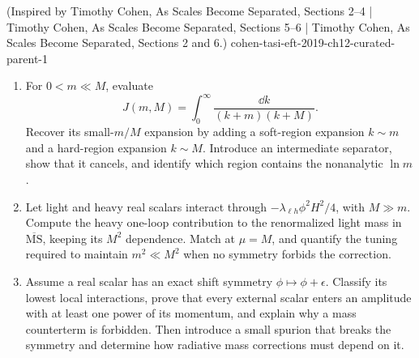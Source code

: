 \begin{enumerate}
  {(Inspired by Timothy Cohen, As Scales Become Separated, Sections 2--4 | Timothy Cohen, As Scales Become Separated, Sections 5--6 | Timothy Cohen, As Scales Become Separated, Sections 2 and 6.)}
  {cohen-tasi-eft-2019-ch12-curated-parent-1}
\begin{enumerate}
\item
For \(0<m\ll M\), evaluate
\[
 J(m,M)=\int_0^\infty\frac{\dd k}{(k+m)(k+M)}.
\]
Recover its small-\(m/M\) expansion by adding a soft-region expansion
\(k\sim m\) and a hard-region expansion \(k\sim M\).  Introduce an
intermediate separator, show that it cancels, and identify which region
contains the nonanalytic \(\ln m\).
\item
Let light and heavy real scalars interact through
\(-\lambda_{\ell h}\phi^2H^2/4\), with \(M\gg m\).  Compute the heavy
one-loop contribution to the renormalized light mass in
\(\overline{\mathrm{MS}}\), keeping its \(M^2\) dependence.  Match at
\(\mu=M\), and quantify the tuning required to maintain \(m^2\ll M^2\)
when no symmetry forbids the correction.
\item
Assume a real scalar has an exact shift symmetry
\(\phi\mapsto\phi+\epsilon\).  Classify its lowest local interactions,
prove that every external scalar enters an amplitude with at least one
power of its momentum, and explain why a mass counterterm is forbidden.
Then introduce a small spurion that breaks the symmetry and determine how
radiative mass corrections must depend on it.
\end{enumerate}


\end{enumerate}
